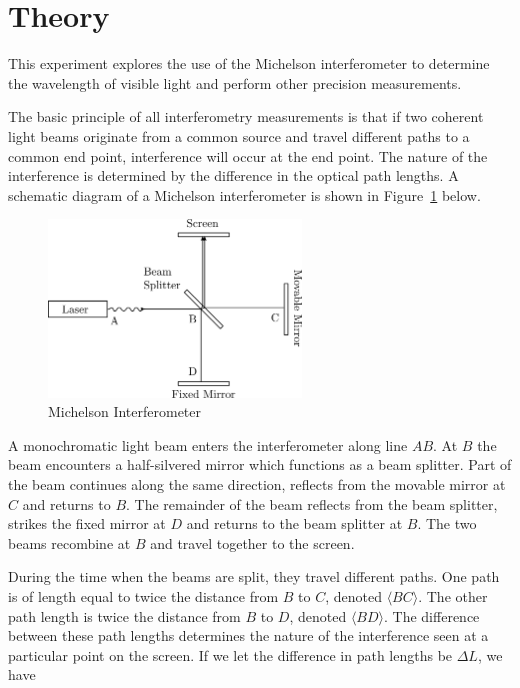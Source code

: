 \section{Theory}

This experiment explores the use of the Michelson interferometer to
determine the wavelength of visible light and perform other precision
measurements.

The basic principle of all interferometry measurements is that 
if two coherent light beams originate from a common source and 
travel different paths to a common end point, interference will 
occur at the end point. The nature of the interference is determined 
by the difference in the optical path lengths. A schematic diagram 
of a Michelson interferometer is shown in Figure~\ref{schematic} below.

\begin{figure}[htbp]
\begin{center}
\includegraphics[width=0.6\textwidth]{../images/inter.png}
\caption{Michelson Interferometer }
\label{schematic}
\end{center}
\end{figure}

A monochromatic light beam enters the interferometer along line $AB$. At
$B$ the beam encounters a half-silvered mirror which functions as a beam
splitter. Part of the beam continues along the same direction, reflects
from the movable mirror at $C$ and returns to $B$. The remainder of the beam
reflects from the beam splitter, strikes the fixed mirror at $D$ and
returns to the beam splitter at $B$. The two beams recombine at $B$ and
travel together to the screen. 

During the time when the beams are split, they travel different 
paths. One path is of length equal to twice the distance from 
$B$ to $C$, denoted $\langle BC\rangle$. The other path length is twice 
the distance from $B$ to $D$, denoted $\langle BD\rangle$. The difference 
between these path lengths determines the nature of the interference 
seen at a particular point on the screen. If we let the difference in path lengths be $\Delta L$, we have

